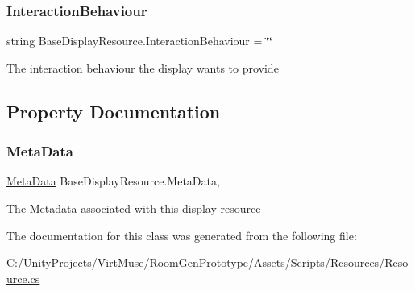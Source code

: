 \subsubsection{\texorpdfstring{Interaction\+Behaviour}{InteractionBehaviour}}
{\footnotesize\ttfamily string Base\+Display\+Resource.\+Interaction\+Behaviour = \char`\"{}\char`\"{}}



The interaction behaviour the display wants to provide 



\subsection{Property Documentation}
\mbox{\label{class_base_display_resource_a0a9f0a877d169dd6c5c07c66ae563618}} 
\subsubsection{\texorpdfstring{Meta\+Data}{MetaData}}
{\footnotesize\ttfamily \mbox{\hyperlink{class_meta_data}{Meta\+Data}} Base\+Display\+Resource.\+Meta\+Data\hspace{0.3cm}{\ttfamily [get]}, {\ttfamily [set]}}



The Metadata associated with this display resource 



The documentation for this class was generated from the following file\+:\begin{DoxyCompactItemize}
\item 
C\+:/\+Unity\+Projects/\+Virt\+Muse/\+Room\+Gen\+Prototype/\+Assets/\+Scripts/\+Resources/\mbox{\hyperlink{_resource_8cs}{Resource.\+cs}}\end{DoxyCompactItemize}
